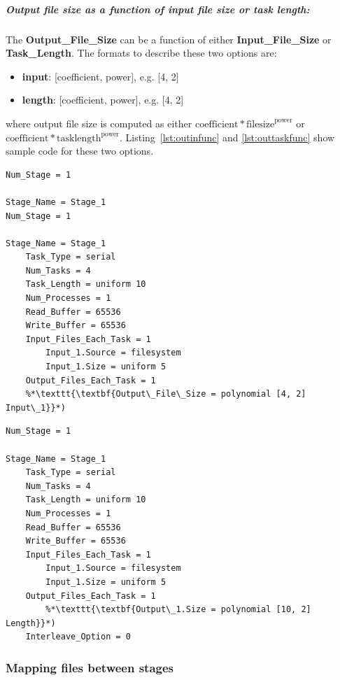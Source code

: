 \documentclass[10pt,a4paper]{article}
\begin{document}
\subparagraph{Output file size as a function of input file size or task length:}
The \textbf{Output\_File\_Size} can be a function of either \textbf{Input\_File\_Size} or \textbf{Task\_Length}. The formats to describe these two options are:
\begin{itemize}
\item{\textbf{input}}: [coefficient, power], e.g. [4, 2]
\item{\textbf{length}}: [coefficient, power], e.g. [4, 2]
\end{itemize}
where output file size is computed as either 
\( \text{coefficient} * \text{filesize} ^ \text{power}\)
or
\( \text{coefficient} * \text{tasklength} ^ \text{power}\).
Listing~\ref{lst:outinfunc} and \ref{lst:outtaskfunc} show sample code for these two options.

\begin{lstlisting}[caption=Use case of output file size as a function of input file size, label=lst:outinfunc, linewidth=1.0\textwidth, xleftmargin=2.5ex]
Num_Stage = 1

Stage_Name = Stage_1
Num_Stage = 1

Stage_Name = Stage_1
    Task_Type = serial
    Num_Tasks = 4  
    Task_Length = uniform 10
    Num_Processes = 1
    Read_Buffer = 65536
    Write_Buffer = 65536
    Input_Files_Each_Task = 1
        Input_1.Source = filesystem
        Input_1.Size = uniform 5
    Output_Files_Each_Task = 1
    %*\texttt{\textbf{Output\_File\_Size = polynomial [4, 2] Input\_1}}*)
\end{lstlisting}

\begin{lstlisting}[caption=Use case of output file size as a function of task length, label=lst:outtaskfunc, linewidth=1.0\textwidth, xleftmargin=2.5ex]
Num_Stage = 1

Stage_Name = Stage_1
    Task_Type = serial
    Num_Tasks = 4  
    Task_Length = uniform 10
    Num_Processes = 1
    Read_Buffer = 65536
    Write_Buffer = 65536
    Input_Files_Each_Task = 1
        Input_1.Source = filesystem
        Input_1.Size = uniform 5
    Output_Files_Each_Task = 1
        %*\texttt{\textbf{Output\_1.Size = polynomial [10, 2] Length}}*)
    Interleave_Option = 0
\end{lstlisting}

\subsubsection{Mapping files between stages}\label{sec:def_mapping}
\end{document}
